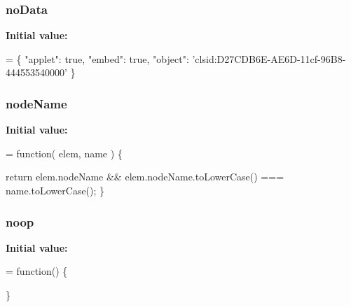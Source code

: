 \hypertarget{jquery-1_810_82-vsdoc_8js_ad32d84c9593cb0546704f6bd04d32386}{
\subsubsection[{no\-Data}]{ no\-Data}}\label{jquery-1_810_82-vsdoc_8js_ad32d84c9593cb0546704f6bd04d32386}
{\bfseries Initial value\-:}
\begin{DoxyCode}
= \{ \textcolor{stringliteral}{"applet"}: \textcolor{keyword}{true},
\textcolor{stringliteral}{"embed"}: \textcolor{keyword}{true},
\textcolor{stringliteral}{"object"}: \textcolor{stringliteral}{'clsid:D27CDB6E-AE6D-11cf-96B8-444553540000'} \}
\end{DoxyCode}
\hypertarget{jquery-1_810_82-vsdoc_8js_a269e960a03eef49b8ed3a84932c1334d}{
\subsubsection[{node\-Name}]{ node\-Name}}\label{jquery-1_810_82-vsdoc_8js_a269e960a03eef49b8ed3a84932c1334d}
{\bfseries Initial value\-:}
\begin{DoxyCode}
= \textcolor{keyword}{function}( elem, name ) \{

        \textcolor{keywordflow}{return} elem.nodeName && elem.nodeName.toLowerCase() === name.toLowerCase();
    \}
\end{DoxyCode}
\hypertarget{jquery-1_810_82-vsdoc_8js_a7acad2bce0af143b1f94283a7a811103}{
\subsubsection[{noop}]{ noop}}\label{jquery-1_810_82-vsdoc_8js_a7acad2bce0af143b1f94283a7a811103}
{\bfseries Initial value\-:}
\begin{DoxyCode}
= \textcolor{keyword}{function}() \{

\}
\end{DoxyCode}
